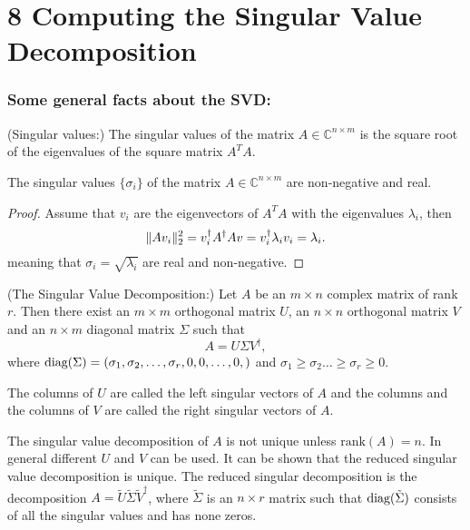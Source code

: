 \section*{8 Computing the Singular Value Decomposition} %

\subsubsection*{Some general facts about the SVD:} %
\begin{definition}(Singular values:)
	The singular values of the matrix $A\in\mathbb C^{n\times m}$ is the 
	square root of the eigenvalues of the square matrix $A^TA$.
\end{definition}
\begin{theorem}
	The singular values $\{\sigma_i\}$ of the matrix $A\in\mathbb C^{n\times m}$ 
	are non-negative and real.
\end{theorem}
\begin{proof}
	Assume that $v_i$ are the eigenvectors of $A^TA$ with the eigenvalues $\lambda_i$,
	then 
	\[
		\lVert{Av_i}\rVert_2^2 = v_i^\dagger A^\dagger A v = v_i^\dagger \lambda_i v_i = \lambda_i. 
	\]
	meaning that $\sigma_i = \sqrt{\lambda_i}$ are real and non-negative.
\end{proof}
\begin{theorem}(The Singular Value Decomposition:)
	Let $A$ be an $m\times n$ complex matrix of rank $r$. Then there exist an $m\times m$
	orthogonal matrix $U$, an $n\times n$ orthogonal matrix $V$ and an $n\times m$ diagonal 
	matrix $\Sigma$ such that 
	\[
		A = U \Sigma V^\dagger,
	\]
	where $\text{diag}{(}\Sigma) = (\sigma_1,\sigma_2,\dots,\sigma_r, 0,0,\dots,0,)$ and 
	$\sigma_1\ge\sigma_2\dots\ge\sigma_r\ge0$.
\end{theorem}
\begin{definition}
	The columns of $U$ are called the left singular vectors of $A$ and the columns and the 
	columns of $V$ are called the right singular vectors of $A$.
\end{definition}
The singular value decomposition of $A$ is not unique unless $\text{rank}(A)=n$. In general 
different $U$ and $V$ can be used. It can be shown that the reduced singular value decomposition
is unique. 
The reduced singular decomposition is the decomposition 
$A = \tilde U\tilde \Sigma\tilde V^\dagger$, where $\tilde\Sigma$ is an $n\times r$
matrix such that $\text{diag}{}(\tilde\Sigma)$ consists of all the singular values and has none zeros.


